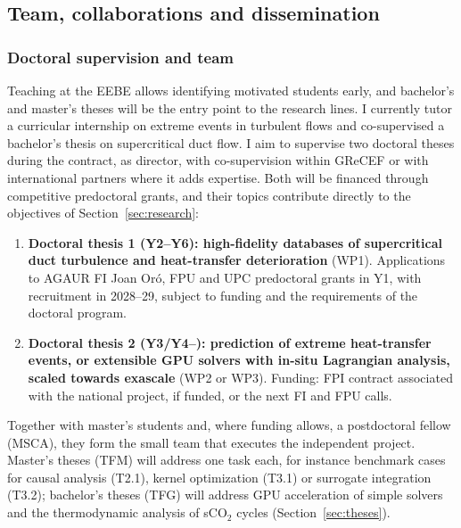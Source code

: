 \documentclass[11pt]{article}
\begin{document}
\subsection{Team, collaborations and dissemination}\label{sec:mobility}\label{sec:dissemination}
\subsubsection*{Doctoral supervision and team}
Teaching at the EEBE allows identifying motivated students early, and bachelor's and
master's theses will be the entry point to the research lines. I currently tutor a
curricular internship on extreme events in turbulent flows and co-supervised a bachelor's
thesis on supercritical duct flow. I aim to supervise two doctoral theses during the
contract, as director, with co-supervision within GReCEF or with international partners where
it adds expertise. Both will be financed through competitive predoctoral grants, and their
topics contribute directly to the objectives of Section~\ref{sec:research}:
\begin{enumerate}
  \item \textbf{Doctoral thesis 1 (Y2--Y6): high-fidelity databases of supercritical duct
  turbulence and heat-transfer deterioration} (WP1). Applications to AGAUR FI Joan Or\'o, FPU
  and UPC predoctoral grants in Y1, with recruitment in 2028--29, subject to funding and the
  requirements of the doctoral program.
  \item \textbf{Doctoral thesis 2 (Y3/Y4--): prediction of extreme heat-transfer events, or
  extensible GPU solvers with in-situ Lagrangian analysis, scaled towards exascale} (WP2 or WP3). Funding: FPI
  contract associated with the national project, if funded, or the next FI and FPU calls.
\end{enumerate}
Together with master's students and, where funding allows, a postdoctoral fellow (MSCA), they
form the small team that executes the independent project.
Master's theses (TFM) will address one task each, for instance benchmark cases for causal
analysis (T2.1), kernel optimization (T3.1) or surrogate integration (T3.2); bachelor's
theses (TFG) will address GPU acceleration of simple solvers and the thermodynamic analysis of
sCO$_2$ cycles (Section~\ref{sec:theses}).
\end{document}
